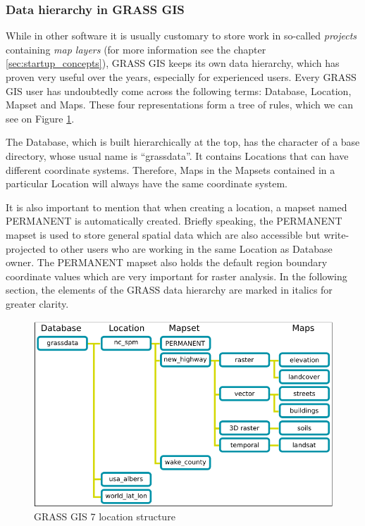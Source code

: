 \documentclass[a4paper,10pt,twoside]{article}
\begin{document}
\subsubsection{Data hierarchy in GRASS GIS}
\label{subsection:hierarchy}
\noindent
\large

\noindent While in other software it is usually customary to store work in so-called \textit{projects} containing \textit{map layers} (for more information see the chapter \ref{sec:startup_concepts}), GRASS GIS keeps its own data hierarchy, which has proven very useful over the years, especially for experienced users. Every GRASS GIS user has undoubtedly come across the following terms: Database, Location, Mapset and Maps. These four representations form a tree of rules, which we can see on Figure \ref{fig:grass_data_hierarchy}.

The Database, which is built hierarchically at the top, has the character of a base directory, whose usual name is ``grassdata''. It contains Locations that can have different coordinate systems. Therefore, Maps in the Mapsets contained in a particular Location will always have the same coordinate system.

It is also important to mention that when creating a location, a mapset named PERMANENT is automatically created. Briefly speaking, the PERMANENT mapset is used to store general spatial data which are also accessible but write-projected to other users who are working in the same Location as Database owner. The PERMANENT mapset also holds the default region boundary coordinate values which are very important for raster analysis. In the following section, the elements of the GRASS data hierarchy are marked in italics for greater clarity.

\vspace{0.3cm}
\begin{figure}[hbt!]
\begin{center}
\includegraphics[width=14cm]{../pictures/grass_data_hiearchy.png} 
\caption[GRASS GIS 7 location structure]{GRASS GIS 7 location structure}
\label{fig:grass_data_hierarchy}
\end{center}
\end{figure}
\end{document}
